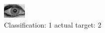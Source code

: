 \begin{figure}[h!]
\begin{center}
\includegraphics[width=0.60\columnwidth]{figures/ID1984_class_1_target_2.png}
\end{center}
\caption{ Classification: 1 actual target: 2}
\label{fig:ID1984_class_1_target_2}
\end{figure}

